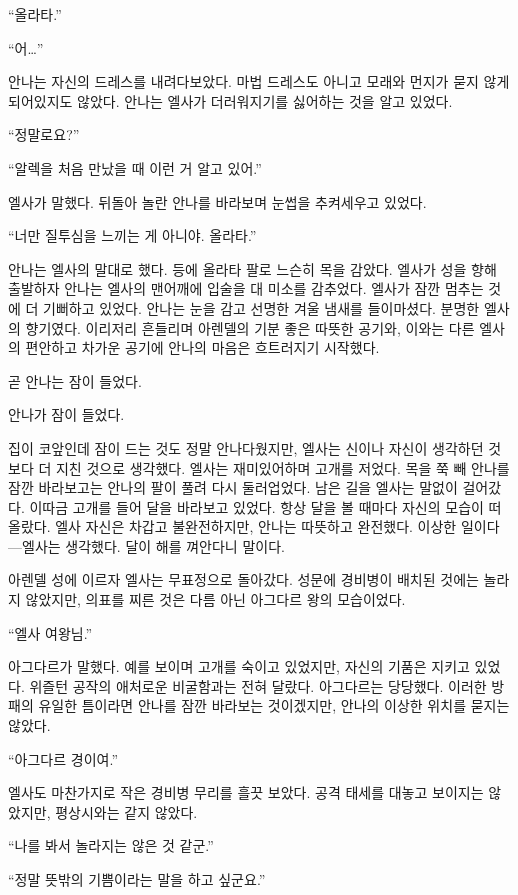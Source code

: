 ``올라타.''

``어\ldots''

안나는 자신의 드레스를 내려다보았다. 마법 드레스도 아니고 모래와 먼지가 묻지 않게 되어있지도 않았다. 안나는 엘사가 더러워지기를 싫어하는 것을 알고 있었다.

``정말로요?''

``알렉을 처음 만났을 때 이런 거 알고 있어.''

엘사가 말했다. 뒤돌아 놀란 안나를 바라보며 눈썹을 추켜세우고 있었다.

``너만 질투심을 느끼는 게 아니야. 올라타.''

안나는 엘사의 말대로 했다. 등에 올라타 팔로 느슨히 목을 감았다. 엘사가 성을 향해 출발하자 안나는 엘사의 맨어깨에 입술을 대 미소를 감추었다. 엘사가 잠깐 멈추는 것에 더 기뻐하고 있었다. 안나는 눈을 감고 선명한 겨울 냄새를 들이마셨다. 분명한 엘사의 향기였다. 이리저리 흔들리며 아렌델의 기분 좋은 따뜻한 공기와, 이와는 다른 엘사의 편안하고 차가운 공기에 안나의 마음은 흐트러지기 시작했다.

곧 안나는 잠이 들었다.

\textbreak

안나가 잠이 들었다.

집이 코앞인데 잠이 드는 것도 정말 안나다웠지만, 엘사는 신이나 자신이 생각하던 것보다 더 지친 것으로 생각했다. 엘사는 재미있어하며 고개를 저었다. 목을 쭉 빼 안나를 잠깐 바라보고는 안나의 팔이 풀려 다시 둘러업었다. 남은 길을 엘사는 말없이 걸어갔다. 이따금 고개를 들어 달을 바라보고 있었다. 항상 달을 볼 때마다 자신의 모습이 떠올랐다. 엘사 자신은 차갑고 불완전하지만, 안나는 따뜻하고 완전했다. 이상한 일이다—엘사는 생각했다. 달이 해를 껴안다니 말이다.

아렌델 성에 이르자 엘사는 무표정으로 돌아갔다. 성문에 경비병이 배치된 것에는 놀라지 않았지만, 의표를 찌른 것은 다름 아닌 아그다르 왕의 모습이었다.

``엘사 여왕님.''

아그다르가 말했다. 예를 보이며 고개를 숙이고 있었지만, 자신의 기품은 지키고 있었다. 위즐턴 공작의 애처로운 비굴함과는 전혀 달랐다. 아그다르는 당당했다. 이러한 방패의 유일한 틈이라면 안나를 잠깐 바라보는 것이겠지만, 안나의 이상한 위치를 묻지는 않았다.

``아그다르 경이여.''

엘사도 마찬가지로 작은 경비병 무리를 흘끗 보았다. 공격 태세를 대놓고 보이지는 않았지만, 평상시와는 같지 않았다.

``나를 봐서 놀라지는 않은 것 같군.''

``정말 뜻밖의 기쁨이라는 말을 하고 싶군요.''

